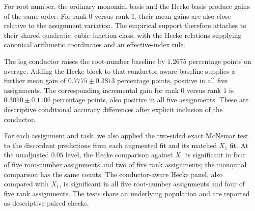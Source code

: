 \documentclass[12pt,reqno]{amsart}
\numberwithin{equation}{section}
\theoremstyle{plain}
\theoremstyle{definition}
\theoremstyle{remark}
\begin{document}
\begin{table}[t]
\centering
\caption{Matched controls over five random assignments of one fixed balanced population.
The $X_1$ column gives mean balanced accuracy in percent; the other columns give the mean change in percentage points relative to the matched $X_1$ fit.
Values after $\pm$ are sample standard deviations, and parenthetical fractions count positive changes.}
\label{tabAdditionalRandom}
\end{table}

For root number, the ordinary monomial basis and the Hecke basis produce gains of the same order.
For rank $0$ versus rank $1$, their mean gains are also close relative to the assignment variation.
The empirical support therefore attaches to their shared quadratic--cubic function class, with the Hecke relations supplying canonical arithmetic coordinates and an effective-index rule.

The log conductor raises the root-number baseline by $1.2675$ percentage points on average.
Adding the Hecke block to that conductor-aware baseline supplies a further mean gain of $0.7775\pm0.3813$ percentage points, positive in all five assignments.
The corresponding incremental gain for rank $0$ versus rank $1$ is $0.3050\pm0.1106$ percentage points, also positive in all five assignments.
These are descriptive conditional accuracy differences after explicit inclusion of the conductor.

For each assignment and task, we also applied the two-sided exact McNemar test to the discordant predictions from each augmented fit and its matched $X_1$ fit.
At the unadjusted $0.05$ level, the Hecke comparison against $X_1$ is significant in four of five root-number assignments and two of five rank assignments; the monomial comparison has the same counts.
The conductor-aware Hecke panel, also compared with $X_1$, is significant in all five root-number assignments and four of five rank assignments.
The tests share an underlying population and are reported as descriptive paired checks.
\end{document}

